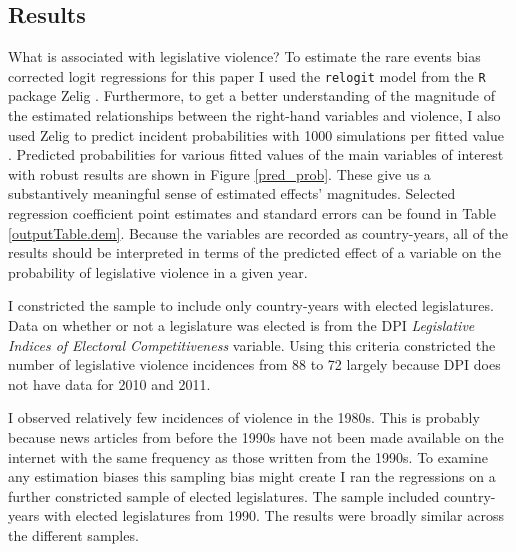 \documentclass[a4paper]{article}\usepackage{graphicx, color}
\begin{document}


\subsection{Results}

What is associated with legislative violence? To estimate the rare events bias corrected logit regressions for this paper I used the {\tt{relogit}} model from the {\tt{R}} package Zelig \citep{IMAIKingZelig2008}. Furthermore, to get a better understanding of the magnitude of the estimated relationships between the right-hand variables and violence, I also used Zelig to predict incident probabilities with 1000 simulations per fitted value \citep[see][]{King2002}. Predicted probabilities for various fitted values of the main variables of interest with robust results are shown in Figure \ref{pred_prob}. These give us a substantively meaningful sense of estimated effects' magnitudes. Selected regression coefficient point estimates and standard errors can be found in Table \ref{outputTable.dem}. Because the variables are recorded as country-years, all of the results should be interpreted in terms of the predicted effect of a variable on the probability of legislative violence in a given year.

I constricted the sample to include only country-years with elected legislatures. Data on whether or not a legislature was elected is from the DPI {\emph{Legislative Indices of Electoral Competitiveness}} variable. Using this criteria constricted the number of legislative violence incidences from 88 to 72 largely because DPI does not have data for 2010 and 2011.

I observed relatively few incidences of violence in the 1980s. This is probably because news articles from before the 1990s have not been made available on the internet with the same frequency as those written from the 1990s. To examine any estimation biases this sampling bias might create I ran the regressions on a further constricted sample of elected legislatures. The sample included country-years with elected legislatures from 1990. The results were broadly similar across the different samples. 
\end{document}

